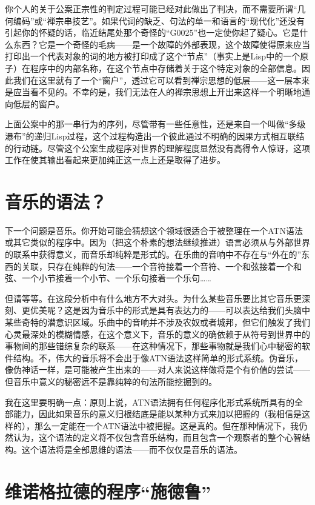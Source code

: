 你个人的关于公案正宗性的判定过程可能已经对此做出了判决，而不需要所谓“几何编码”或“禅宗串技艺”。如果代词的缺乏、句法的单一和语言的“现代化”还没有引起你的怀疑的话，临近结尾处那个奇怪的“G0025”也一定使你起了疑心。它是什么东西？它是一个奇怪的毛病——是一个故障的外部表现，这个故障使得原来应当打印出一个代表对象的词的地方被打印成了这个“节点”（事实上是Lisp中的一个原子）在程序中的内部名称，在这个节点中存储着关于这个特定对象的全部信息。因此我们在这里就有了一个“窗户”，透过它可以看到禅宗思想的低层——这一层本来是应当看不见的。不幸的是，我们无法在人的禅宗思想上开出来这样一个明晰地通向低层的窗户。

上面公案中的那一串行为的序列，尽管带有一些任意性，还是来自一个叫做“多级瀑布”的递归Lisp过程，这个过程构造出一个彼此通过不明确的因果方式相互联结的行动链。尽管这个公案生成程序对世界的理解程度显然没有高得令人惊讶，这项工作在使其输出看起来更加纯正这一点上还是取得了进步。

\section{音乐的语法？}

下一个问题是音乐。你开始可能会猜想这个领域很适合于被整理在一个ATN语法或其它类似的程序中。因为（把这个朴素的想法继续推进）语言必须从与外部世界的联系中获得意义，而音乐却纯粹是形式的。在乐曲的音响中不存在与“外在的”东西的关联，只存在纯粹的句法——一个音符接着一个音符、一个和弦接着一个和弦、一个小节接着一个小节、一个乐句接着一个乐句……

但请等等。在这段分析中有什么地方不大对头。为什么某些音乐要比其它音乐更深刻、更优美呢？这是因为音乐中的形式是具有表达力的——可以表达给我们头脑中某些奇特的潜意识区域。乐曲中的音响并不涉及农奴或者城邦，但它们触发了我们心灵最深处的模糊情感，在这个意义下，音乐的意义的确依赖于从符号到世界中的事物间的那些错综复杂的联系——在这种情况下，那些事物就是我们心中秘密的软件结构。不，伟大的音乐将不会出于像ATN语法这样简单的形式系统。伪音乐，像伪神话一样，是可能被产生出来的——对人来说这样做将是个有价值的尝试——但音乐中意义的秘密远不是靠纯粹的句法所能挖掘到的。

我在这里要明确一点：原则上说，ATN语法拥有任何程序化形式系统所具有的全部能力，因此如果音乐的意义归根结底是能以某种方式来加以把握的（我相信是这样的），那么一定能在一个ATN语法中被把握。这是真的。但在那种情况下，我仍然认为，这个语法的定义将不仅包含音乐结构，而且包含一个观察者的整个心智结构。这个语法将是全部思维的语法——而不仅仅是音乐的语法。

\section{维诺格拉德的程序“施徳鲁”}

